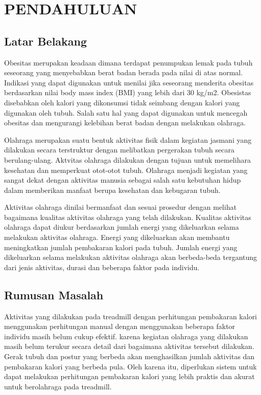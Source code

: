 \section{PENDAHULUAN}

\subsection{Latar Belakang}

Obesitas merupakan keadaan dimana terdapat penumpukan lemak pada tubuh seseorang yang menyebabkan berat badan berada pada nilai di atas normal. Indikasi yang dapat digunakan untuk menilai jika seseorang menderita obesitas berdasarkan nilai body mass index (BMI) yang lebih dari 30 kg/m2. Obesistas disebabkan oleh kalori yang dikonsumsi tidak seimbang dengan kalori yang digunakan oleh tubuh. Salah satu hal yang dapat digunakan untuk mencegah obesitas dan mengurangi kelebihan berat badan dengan melakukan olahraga.

Olahraga merupakan suatu bentuk aktivitas fisik dalam kegiatan jasmani yang dilakukan secara terstruktur dengan melibatkan pergerakan tubuh secara berulang-ulang. Aktvitas olahraga dilakukan dengan tujuan untuk memelihara kesehatan dan memperkuat otot-otot tubuh. Olahraga menjadi kegiatan yang sangat dekat dengan aktivitas manusia sebagai salah satu kebutuhan hidup dalam memberikan manfaat berupa kesehatan dan kebugaran tubuh. 

Aktivitas olahraga dinilai bermanfaat dan sesuai prosedur dengan melihat bagaimana kualitas aktivitas olahraga yang telah dilakukan. Kualitas aktivitas olahraga dapat diukur berdasarkan jumlah energi yang dikeluarkan selama melakukan aktivitas olahraga. Energi yang dikeluarkan akan membantu meningkatkan jumlah pembakaran kalori pada tubuh. Jumlah energi yang dikeluarkan selama melakukan aktivitas olahraga akan berbeda-beda tergantung dari jenis aktivitas, durasi dan beberapa faktor pada individu.

\subsection{Rumusan Masalah}

Aktivitas yang dilakukan pada treadmill dengan perhitungan pembakaran kalori  menggunakan perhitungan manual dengan menggunakan beberapa faktor individu masih belum cukup efektif. karena kegiatan olahraga yang dilakukan masih belum terukur secara detail dari bagaimana aktivitas tersebut dilakukan. Gerak tubuh dan postur yang berbeda akan menghasilkan jumlah aktivitas dan pembakaran kalori yang berbeda pula. Oleh karena itu, diperlukan sistem untuk dapat melakukan perhitungan pembakaran kalori yang lebih praktis dan akurat untuk berolahraga pada treadmill.

